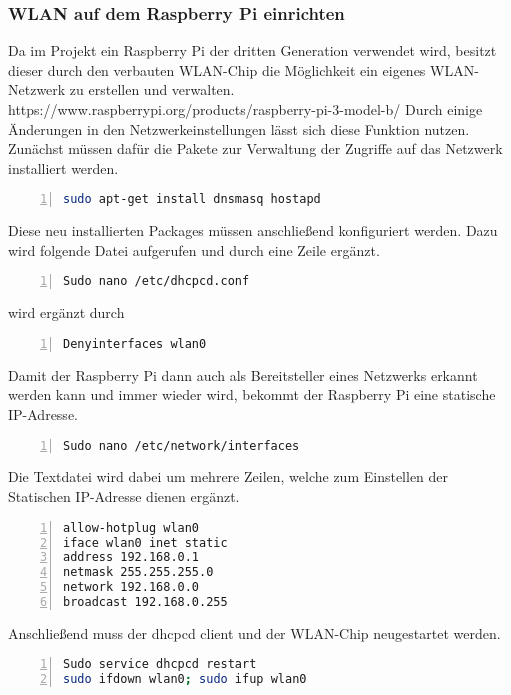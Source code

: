 \subsubsection{\ac{WLAN} auf dem Raspberry Pi einrichten}
Da im Projekt ein Raspberry Pi der dritten Generation verwendet wird, besitzt dieser durch den verbauten \ac{WLAN}-Chip die Möglichkeit ein eigenes \ac{WLAN}-Netzwerk zu erstellen und verwalten. https://www.raspberrypi.org/products/raspberry-pi-3-model-b/ 
Durch einige Änderungen in den Netzwerkeinstellungen lässt sich diese Funktion nutzen.
Zunächst müssen dafür die Pakete zur Verwaltung der Zugriffe auf das Netzwerk installiert werden.
\begin{lstlisting}[caption={Installation dnsmasq hostapd}, language={bash}, numbers=left]
sudo apt-get install dnsmasq hostapd
\end{lstlisting}
Diese neu installierten Packages müssen anschließend konfiguriert werden. Dazu wird folgende Datei aufgerufen und durch eine Zeile ergänzt.
\begin{lstlisting}[caption={Konfiguration DHCP Server Schritt 1}, language={bash}, numbers=left]
Sudo nano /etc/dhcpcd.conf
\end{lstlisting}
wird ergänzt durch
\begin{lstlisting}[caption={Konfiguration DHCP Server Schritt 2}, language={bash}, numbers=left]
Denyinterfaces wlan0
\end{lstlisting}
Damit der Raspberry Pi dann auch als Bereitsteller eines Netzwerks erkannt werden kann und immer wieder wird, bekommt der Raspberry Pi eine statische \ac{IP}-Adresse. 
\begin{lstlisting}[caption={Konfiguration Interfaces Schritt 1}, language={bash}, numbers=left]
Sudo nano /etc/network/interfaces
\end{lstlisting}
Die Textdatei wird dabei um mehrere Zeilen, welche zum Einstellen der Statischen \ac{IP}-Adresse dienen ergänzt.
\begin{lstlisting}[caption={Konfiguration Interfaces Schritt 2}, language={bash}, numbers=left]
allow-hotplug wlan0
iface wlan0 inet static
address 192.168.0.1
netmask 255.255.255.0
network 192.168.0.0
broadcast 192.168.0.255
\end{lstlisting}
Anschließend muss der dhcpcd client und der \ac{WLAN}-Chip neugestartet werden.
\begin{lstlisting}[caption={Konfiguration Interfaces Schritt 3}, language={bash}, numbers=left] 
Sudo service dhcpcd restart
sudo ifdown wlan0; sudo ifup wlan0
\end{lstlisting}

